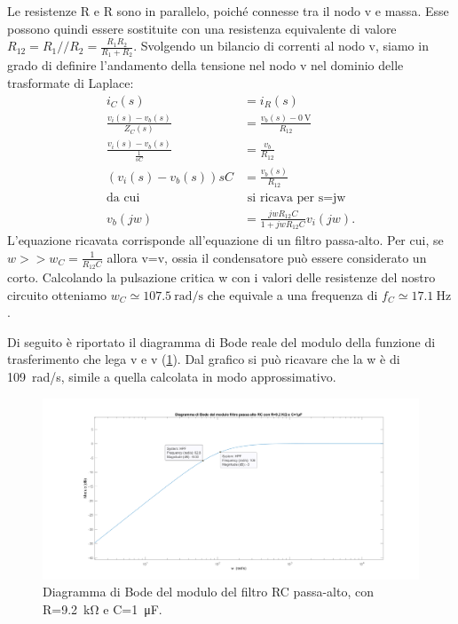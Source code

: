 \noindent
Le resistenze R e R sono in parallelo, poiché connesse tra il nodo v e massa. Esse possono quindi essere sostituite con una resistenza equivalente di valore $R_{12}=R_1 // R_2=\frac{R_1 R_2}{R_1+R_2}$. Svolgendo un bilancio di correnti al nodo v, siamo in grado di definire l'andamento della tensione nel nodo v nel dominio delle trasformate di Laplace:
\begin{equation}
	\begin{split}
		i_C(s)&=i_R(s) \\
		\frac{v_i(s)-v_b(s)}{Z_C(s)}&=\frac{v_b(s)-\SI{0}{\volt}}{R_{12}} \\
		\frac{v_i(s)-v_b(s)}{\frac{1}{sC}}&=\frac{v_b}{R_{12}} \\
		(v_i(s)-v_b(s))sC&=\frac{v_b(s)}{R_{12}} \\
		\text{da cui} & \text{ si ricava per s=jw} \\
		v_b(jw)&=\frac{jwR_{12}C}{1+jwR_{12}C}v_i(jw).
	\end{split}
\end{equation}
L'equazione ricavata corrisponde all'equazione di un filtro passa-alto. Per cui, se $w>>w_C=\frac{1}{R_{12}C}$ allora v=v, ossia il condensatore può essere considerato un corto. Calcolando la pulsazione critica w con i valori delle resistenze del nostro circuito otteniamo $w_C\simeq \SI{107.5}{\radian/\second}$ che equivale a una frequenza di $f_C\simeq\SI{17.1}{\hertz}$.

Di seguito è riportato il diagramma di Bode reale del modulo della funzione di trasferimento che lega v e v (\Fig\ref{fig:hpf}). Dal grafico si può ricavare che la w è di \SI{109}{\radian/\second}, simile a quella calcolata in modo approssimativo. 
\begin{figure}[h!]
	\centering
	\includegraphics[width=1\linewidth]{./OtherFiles/Laboratorio 4/boderc.png}
	\caption{Diagramma di Bode del modulo del filtro RC passa-alto, con R=\SI{9.2}{\kilo\ohm} e C=\SI{1}{\micro\farad}.}
	\label{fig:hpf}
\end{figure}

